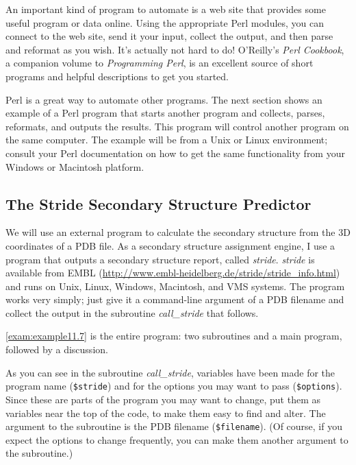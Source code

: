 An important kind of program to automate is a web site that provides some useful program or data online. Using the appropriate Perl modules, you can connect to the web site, send it your input, collect the output, and then parse and reformat as you wish. It's actually not hard to do! O'Reilly's \textit{Perl Cookbook}, a companion volume to \textit{Programming Perl}, is an excellent source of short programs and helpful descriptions to get you started.

Perl is a great way to automate other programs. The next section shows an example of a Perl program that starts another program and collects, parses, reformats, and outputs the results. This program will control another program on the same computer. The example will be from a Unix or Linux environment; consult your Perl documentation on how to get the same functionality from your Windows or Macintosh platform. 

\subsection{The Stride Secondary Structure Predictor}
We will use an external program to calculate the secondary structure from the 3D coordinates of a PDB file. As a secondary structure assignment engine, I use a program that outputs a secondary structure report, called \textit{stride}. \textit{stride} is available from EMBL (\href{http://www.embl-heidelberg.de/stride/stride\_info.html}{http://www.embl-heidelberg.de/stride/stride\_info.html}) and runs on Unix, Linux, Windows, Macintosh, and VMS systems. The program works very simply; just give it a command-line argument of a PDB filename and collect the output in the subroutine \textit{call\_stride} that follows.

\autoref{exam:example11.7} is the entire program: two subroutines and a main program, followed by a discussion. 



As you can see in the subroutine \textit{call\_stride}, variables have been made for the program name (\verb|$stride|) and for the options you may want to pass (\verb|$options|). Since these are parts of the program you may want to change, put them as variables near the top of the code, to make them easy to find and alter. The argument to the subroutine is the PDB filename (\verb|$filename|). (Of course, if you expect the options to change frequently, you can make them another argument to the subroutine.)

